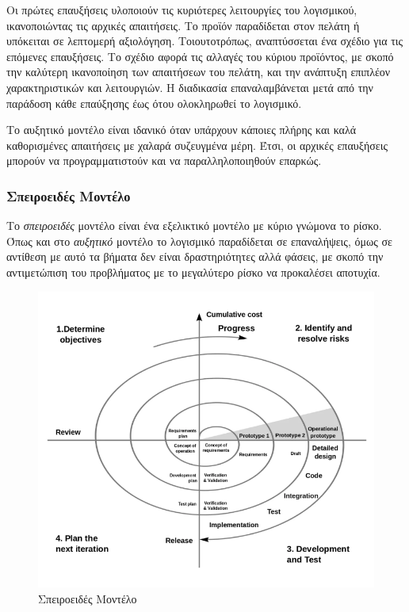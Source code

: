 Οι πρώτες επαυξήσεις υλοποιούν τις κυριότερες λειτουργίες του λογισμικού, ικανοποιώντας τις αρχικές απαιτήσεις. Το προϊόν παραδίδεται στον πελάτη ή υπόκειται σε λεπτομερή αξιολόγηση. Τοιουτοτρόπως, αναπτύσσεται ένα σχέδιο για τις επόμενες επαυξήσεις. Το σχέδιο αφορά τις αλλαγές του κύριου προϊόντος, με σκοπό την καλύτερη ικανοποίηση των απαιτήσεων του πελάτη, και την ανάπτυξη επιπλέον χαρακτηριστικών και λειτουργιών. Η διαδικασία επαναλαμβάνεται μετά από την παράδοση κάθε επαύξησης έως ότου ολοκληρωθεί το λογισμικό.

Το αυξητικό μοντέλο είναι ιδανικό όταν υπάρχουν κάποιες πλήρης και καλά καθορισμένες απαιτήσεις με χαλαρά συζευγμένα μέρη. Έτσι, οι αρχικές επαυξήσεις μπορούν να προγραμματιστούν και να παραλληλοποιηθούν επαρκώς.

\subsubsection{Σπειροειδές Μοντέλο}

Το \textsl{σπειροειδές} μοντέλο είναι ένα εξελικτικό μοντέλο με κύριο γνώμονα το ρίσκο. Όπως και στο \textsl{αυξητικό} μοντέλο το λογισμικό παραδίδεται σε επαναλήψεις, όμως σε αντίθεση με αυτό τα βήματα δεν είναι δραστηριότητες αλλά φάσεις, με σκοπό την αντιμετώπιση του προβλήματος με το μεγαλύτερο ρίσκο να προκαλέσει αποτυχία.

\begin{figure}[h]
    \centering
    \includegraphics[scale=2]{images/chapter2/software_engineering/spiral_process_model.png}
    \caption{Σπειροειδές Μοντέλο}
    \label{fig:spiral_process_model}
\end{figure}

